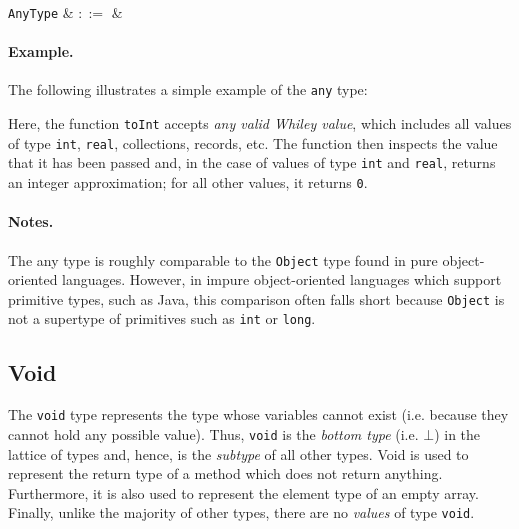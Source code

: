 \begin{syntax}
  \verb+AnyType+ & $::=$ &  \\
\end{syntax}

\paragraph{Example.} The following illustrates a simple example of the \lstinline{any} type:



Here, the function \lstinline{toInt} accepts {\em any valid Whiley value}, which includes all values of type \lstinline{int}, \lstinline{real}, collections, records, etc.  The function then inspects the value that it has been passed and, in the case of values of type \lstinline{int} and \lstinline{real}, returns an integer approximation; for all other values, it returns \lstinline{0}.

\paragraph{Notes.}  The any type is roughly comparable to the \lstinline{Object} type found in pure object-oriented languages.  However, in impure object-oriented languages which support primitive types, such as Java, this comparison often falls short because \lstinline{Object} is not a supertype of primitives such as \lstinline{int} or \lstinline{long}.


\subsection{Void}
\label{c_types_void}

The \lstinline{void} type represents the type whose variables cannot exist (i.e. because they cannot hold any possible value).  Thus, \lstinline{void} is the {\em bottom type} (i.e. $\bot$) in the lattice of types and, hence, is the {\em subtype} of all other types.  Void is used to represent the return type of a method which does not return anything.  Furthermore, it is also used to represent the element type of an empty array.  Finally, unlike the majority of other types, there are no {\em values} of type \lstinline{void}.

